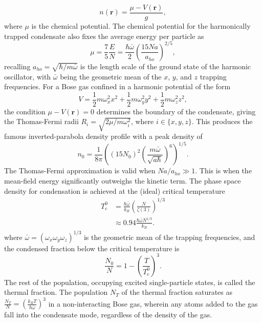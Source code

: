 	
	\begin{equation}
		n(\textbf{r}) = \frac{\mu-V(\textbf{r})}{g},
	\end{equation}
	where $\mu$ is the chemical potential.
	The chemical potential for the harmonically trapped condensate also fixes the average energy per particle as
	\begin{equation}
		\mu = \frac{7}{5}\frac{E}{N} = \frac{\hbar\bar{\omega}}{2}\left(\frac{15 N a}{a_{ho}}\right)^{2/5} ,
	\end{equation}
	recalling $a_{ho} = \sqrt{\hbar/m\bar{\omega}}$ is the length scale of the ground state of the harmonic oscillator, with $\bar{\omega}$ being the geometric mean of the $x$, $y$, and $z$ trapping frequencies.
	For a Bose gas confined in a harmonic potential of the form
	\begin{equation}
		V = \frac{1}{2} m \omega_x^2 x^2 + \frac{1}{2} m \omega_y^2 y^2 + \frac{1}{2} m \omega_z^2 z^2,
	\end{equation}
	the condition $\mu-V(\textbf{r})=0$ determines the boundary of the condensate, giving the Thomas-Fermi radii $R_i = \sqrt{2\mu/m \omega_i^2}$, where $i\in\{x,y,z\}$.
	This produces the famous inverted-parabola density profile with a peak density of
	\begin{equation}
		n_0 = \frac{1}{8 \pi}\left( (15N_0)^2 \left(\frac{m \bar{\omega}}{\sqrt{a \hbar}}\right)^{6}\right)^{1/5}.
		\label{eqn:n0}
	\end{equation}
	The Thomas-Fermi approximation is valid when $N a/a_{ho}\gg1$. 
	This is when the mean-field energy significantly outweighs the kinetic term.
	The phase space density for condensation is achieved at the (ideal) critical temperature 
	\begin{align}
		T_c^{0} &= \frac{\hbar \bar{\omega}}{k_B}\left(\frac{N}{\zeta(3)}\right)^{1/3}\\
				&\approx0.94\frac{\hbar \bar{\omega} N^{1/3}}{k_B}.
	\end{align}
	where $\bar{\omega}=(\omega_x\omega_y\omega_z)^{1/3}$ is the geometric mean of the trapping frequencies, and the condensed fraction below the critical temperature is 
	\begin{equation}
		\frac{N_0}{N} = 1 - \left(\frac{T}{T_c^{0}}\right)^3.
	\end{equation}
	The rest of the population, occupying excited single-particle states, is called the thermal fraction.
	The population $N_T$ of the thermal fraction saturates as $\frac{N_T}{N} = \left(\frac{k_B T}{\hbar \bar{\omega}}\right)^3$ in a non-interacting Bose gas, wherein any atoms added to the gas fall into the condensate mode, regardless of the density of the gas.
